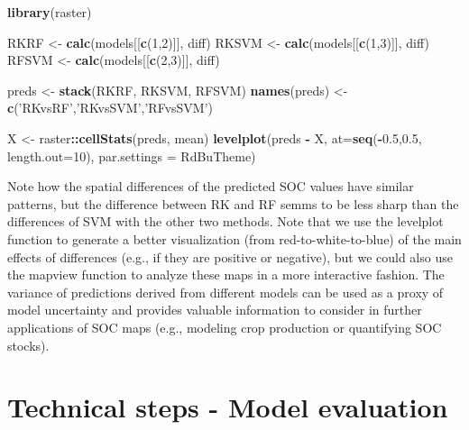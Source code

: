 \documentclass[10pt,b5paper,]{book}
\newenvironment{Shaded}{\begin{snugshade}}{\end{snugshade}}
\newcommand{\DataTypeTok}[1]{\textcolor[rgb]{0.13,0.29,0.53}{#1}}
\newcommand{\DecValTok}[1]{\textcolor[rgb]{0.00,0.00,0.81}{#1}}
\newcommand{\FloatTok}[1]{\textcolor[rgb]{0.00,0.00,0.81}{#1}}
\newcommand{\KeywordTok}[1]{\textcolor[rgb]{0.13,0.29,0.53}{\textbf{#1}}}
\newcommand{\NormalTok}[1]{#1}
\newcommand{\OperatorTok}[1]{\textcolor[rgb]{0.81,0.36,0.00}{\textbf{#1}}}
\newcommand{\StringTok}[1]{\textcolor[rgb]{0.31,0.60,0.02}{#1}}
\theoremstyle{definition}
\theoremstyle{definition}
\theoremstyle{definition}
\theoremstyle{remark}
\begin{document}
\begin{Shaded}
\begin{Highlighting}[]
\KeywordTok{library}\NormalTok{(raster)}

\NormalTok{RKRF  <-}\StringTok{ }\KeywordTok{calc}\NormalTok{(models[[}\KeywordTok{c}\NormalTok{(}\DecValTok{1}\NormalTok{,}\DecValTok{2}\NormalTok{)]], diff)}
\NormalTok{RKSVM <-}\StringTok{ }\KeywordTok{calc}\NormalTok{(models[[}\KeywordTok{c}\NormalTok{(}\DecValTok{1}\NormalTok{,}\DecValTok{3}\NormalTok{)]], diff)}
\NormalTok{RFSVM <-}\StringTok{ }\KeywordTok{calc}\NormalTok{(models[[}\KeywordTok{c}\NormalTok{(}\DecValTok{2}\NormalTok{,}\DecValTok{3}\NormalTok{)]], diff)}

\NormalTok{preds <-}\StringTok{ }\KeywordTok{stack}\NormalTok{(RKRF, RKSVM, RFSVM)}
\KeywordTok{names}\NormalTok{(preds) <-}\StringTok{ }\KeywordTok{c}\NormalTok{(}\StringTok{'RKvsRF'}\NormalTok{,}\StringTok{'RKvsSVM'}\NormalTok{,}\StringTok{'RFvsSVM'}\NormalTok{)}

\NormalTok{X <-}\StringTok{ }\NormalTok{raster}\OperatorTok{::}\KeywordTok{cellStats}\NormalTok{(preds, mean)}
\KeywordTok{levelplot}\NormalTok{(preds }\OperatorTok{-}\StringTok{ }\NormalTok{X, }\DataTypeTok{at=}\KeywordTok{seq}\NormalTok{(}\OperatorTok{-}\FloatTok{0.5}\NormalTok{,}\FloatTok{0.5}\NormalTok{, }\DataTypeTok{length.out=}\DecValTok{10}\NormalTok{),}
          \DataTypeTok{par.settings =}\NormalTok{ RdBuTheme)}
\end{Highlighting}
\end{Shaded}

Note how the spatial differences of the predicted SOC values have
similar patterns, but the difference between RK and RF semms to be less
sharp than the differences of SVM with the other two methods. Note that
we use the levelplot function to generate a better visualization (from
red-to-white-to-blue) of the main effects of differences (e.g., if they
are positive or negative), but we could also use the mapview function to
analyze these maps in a more interactive fashion. The variance of
predictions derived from different models can be used as a proxy of
model uncertainty and provides valuable information to consider in
further applications of SOC maps (e.g., modeling crop production or
quantifying SOC stocks).

\hypertarget{technical-steps---model-evaluation}{%
\section{Technical steps - Model
evaluation}\label{technical-steps---model-evaluation}}
\end{document}
